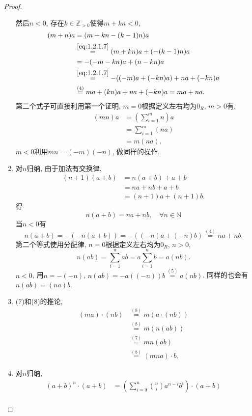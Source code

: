 \begin{proof}
\begin{enumerate}[(1)]
    然后$n < 0$, 存在$k\in \mathbb{Z}_{>0}$使得$m + kn < 0$,
    \[
    \begin{aligned}
        (m + n)a &= (m + kn - (k - 1)n)a\\
        &\overset{\eqref{eq:1.2.1.7}}= (m + kn)a + (-(k - 1)n)a\\
        &= -(-m - kn)a + (n - kn)a\\
        &\overset{\eqref{eq:1.2.1.7}}= -((-m)a + (-kn)a) + na + (-kn)a\\
        &\overset{(4)}= ma + (kn)a + na + (-kn)a = ma + na.
    \end{aligned}   
    \]
        第二个式子可直接利用第一个证明, 
    $m = 0$根据定义左右均为$0_R$, $m > 0$有, 
    \[
    \begin{aligned}
        (mn)a &= \left(\sum_{i = 1}^{m} n\right)a\\
        &= \sum_{i = 1}^{m} (na)\\
        &= m(na).
    \end{aligned}
    \]
    $m < 0$利用$mn = (-m)(-n)$, 做同样的操作.
        \item 对$n$归纳, 由于加法有交换律,
    \[
    \begin{aligned}
        (n + 1)(a + b) &= n(a + b) + a + b\\
        &= na + nb + a + b\\
        &= (n + 1)a + (n + 1)b.
    \end{aligned}
    \]
    得
    \[
        n(a + b) = na + nb, \quad \forall n \in \mathbb{N}
    \]
    当$n < 0$有
    \[
        n(a + b) = -(-n(a + b)) = -((-n)a + (-n)b) \overset{(4)}= na + nb.
    \]
    第二个等式使用分配律, $n = 0$根据定义左右均为$0_R$, $n > 0$,
    \[
        n(ab) = \sum_{i = 1}^{n} ab = a\sum_{i = 1}^{n} b = a(nb).
    \]
    $n < 0$, 用$n = -(-n)$, $n(ab) = -a((-n))b \overset{(5)}= a(nb)$.
    同样的也会有$n(ab) = (na)b$.
        \item (7)和(8)的推论, 
    \[
    \begin{aligned}
        (ma) \cdot (nb) &\overset{(8)}= m(a \cdot (nb))\\
        &\overset{(8)}= m(n(ab))\\
        &\overset{(7)}= mn(ab)\\
        &\overset{(8)}= (mna) \cdot b.
    \end{aligned}
    \]
        \item 对$n$归纳,
    \[
    \begin{aligned}
        (a + b)^n \cdot (a + b) &= \left(\sum_{i = 0}^{n} \binom{n}{i} a^{n - i}b^i\right) \cdot (a + b)\\

\end{aligned}\]
\end{enumerate}
\end{proof}

